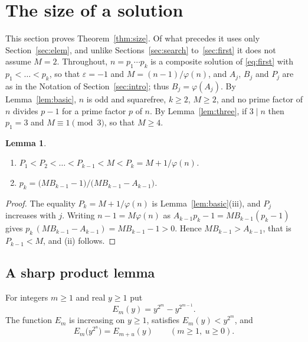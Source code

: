 \documentclass[11pt,reqno]{amsart}
\numberwithin{equation}{section}
\theoremstyle{plain}
\newtheorem{lemma}[theorem]{Lemma}
\theoremstyle{definition}
\theoremstyle{remark}
\begin{document}
\section{The size of a solution}\label{sec:size}

This section proves Theorem~\ref{thm:size}. Of what precedes it uses
only Section~\ref{sec:elem}, and unlike Sections~\ref{sec:search}
to~\ref{sec:first} it does not assume $M=2$. Throughout,
$n=p_1\cdots p_k$ is a composite solution of \eqref{eq:first} with
$p_1<\dots<p_k$, so that $\varepsilon=-1$ and $M=(n-1)/\varphi(n)$,
and $A_j$, $B_j$ and $P_j$ are as in the Notation of
Section~\ref{sec:intro}; thus $B_j=\varphi(A_j)$. By
Lemma~\ref{lem:basic}, $n$ is odd and squarefree, $k\ge2$, $M\ge2$,
and no prime factor of $n$ divides $p-1$ for a prime factor $p$ of
$n$. By Lemma~\ref{lem:three}, if $3\mid n$ then $p_1=3$ and
$M\equiv1\pmod3$, so that $M\ge4$.

\begin{lemma}\label{lem:sizefacts}
\begin{enumerate}[label=\textup{(\roman*)}]
\item $P_1<P_2<\dots<P_{k-1}<M<P_k=M+1/\varphi(n)$.
\item $p_k=\bigl(MB_{k-1}-1\bigr)/\bigl(MB_{k-1}-A_{k-1}\bigr)$.
\end{enumerate}
\end{lemma}

\begin{proof}
The equality $P_k=M+1/\varphi(n)$ is Lemma~\ref{lem:basic}(iii), and
$P_j$ increases with $j$. Writing $n-1=M\varphi(n)$ as
$A_{k-1}p_k-1=MB_{k-1}(p_k-1)$ gives
$p_k\,(MB_{k-1}-A_{k-1})=MB_{k-1}-1>0$. Hence $MB_{k-1}>A_{k-1}$, that
is $P_{k-1}<M$, and (ii) follows.
\end{proof}

\subsection{A sharp product lemma}\label{sec:product}
For integers $m\ge1$ and real $y\ge1$ put
\[
  E_m(y)=y^{2^m}-y^{2^{m-1}} .
\]
The function $E_m$ is increasing on $y\ge1$, satisfies
$E_m(y)<y^{2^m}$, and
\begin{equation}\label{eq:Ecomp}
  E_m\bigl(y^{2^u}\bigr)=E_{m+u}(y)\qquad(m\ge1,\ u\ge0).
\end{equation}
\end{document}
